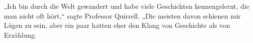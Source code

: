 „Ich bin durch die Welt gewandert und habe viele Geschichten kennengelernt, die man nicht oft hört,“ sagte Professor Quirrell. „Die meisten davon schienen mir Lügen zu sein, aber ein paar hatten eher den Klang von Geschichte als von Erzählung.
